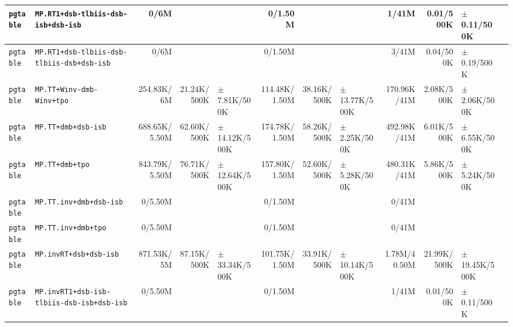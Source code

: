 \begin{tabular}{l l  | r r l | r r l | r r l l}
        \verb|pgtable| &                    \verb|MP.RT1+dsb-tlbiis-dsb-isb+dsb-isb| &           0/6M &                       &                   &        0/1.50M &                       &                   &          1/41M &             0.01/500K &    $\pm$ 0.11/500K & \\ \hline 
        \verb|pgtable| &             \verb|MP.RT1+dsb-tlbiis-dsb-tlbiis-dsb+dsb-isb| &           0/6M &                       &                   &        0/1.50M &                       &                   &          3/41M &             0.04/500K &    $\pm$ 0.19/500K & \\ \hline 
        \verb|pgtable| &                              \verb|MP.TT+Winv-dmb-Winv+tpo| &     254.83K/6M &           21.24K/500K &  $\pm$ 7.81K/500K &  114.48K/1.50M &           38.16K/500K & $\pm$ 13.77K/500K &    170.96K/41M &            2.08K/500K &   $\pm$ 2.06K/500K & \\ \hline 
        \verb|pgtable| &                                    \verb|MP.TT+dmb+dsb-isb| &  688.65K/5.50M &           62.60K/500K & $\pm$ 14.12K/500K &  174.78K/1.50M &           58.26K/500K &  $\pm$ 2.25K/500K &    492.98K/41M &            6.01K/500K &   $\pm$ 6.55K/500K & \\ \hline 
        \verb|pgtable| &                                        \verb|MP.TT+dmb+tpo| &  843.79K/5.50M &           76.71K/500K & $\pm$ 12.64K/500K &  157.80K/1.50M &           52.60K/500K &  $\pm$ 5.28K/500K &    480.31K/41M &            5.86K/500K &   $\pm$ 5.24K/500K & \\ \hline 
        \verb|pgtable| &                                \verb|MP.TT.inv+dmb+dsb-isb| &        0/5.50M &                       &                   &        0/1.50M &                       &                   &          0/41M &                       &                    & \\ \hline 
        \verb|pgtable| &                                    \verb|MP.TT.inv+dmb+tpo| &        0/5.50M &                       &                   &        0/1.50M &                       &                   &          0/41M &                       &                    & \\ \hline 
        \verb|pgtable| &                                 \verb|MP.invRT+dsb+dsb-isb| &     871.53K/5M &           87.15K/500K & $\pm$ 33.34K/500K &  101.75K/1.50M &           33.91K/500K & $\pm$ 10.14K/500K &   1.78M/40.50M &           21.99K/500K &  $\pm$ 19.45K/500K & \\ \hline 
        \verb|pgtable| &             \verb|MP.invRT1+dsb-isb-tlbiis-dsb-isb+dsb-isb| &        0/5.50M &                       &                   &        0/1.50M &                       &                   &          1/41M &             0.01/500K &    $\pm$ 0.11/500K & \\ \hline 

\end{tabular}
